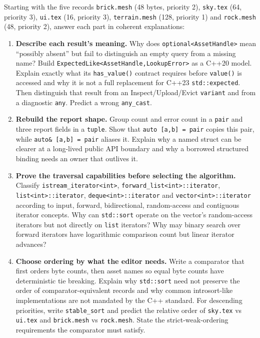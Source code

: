 Starting with the five records \texttt{brick.mesh} (48 bytes, priority 2), \texttt{sky.tex} (64, priority 3), \texttt{ui.tex} (16, priority 3), \texttt{terrain.mesh} (128, priority 1) and \texttt{rock.mesh} (48, priority 2), answer each part in coherent explanations:

\begin{enumerate}
\def\labelenumi{\arabic{enumi}.}
\item
  \textbf{Describe each result's meaning.} Why does \texttt{optional\textless{}AssetHandle\textgreater{}} mean ``possibly absent'' but fail to distinguish an empty query from a missing name? Build \texttt{ExpectedLike\textless{}AssetHandle,LookupError\textgreater{}} as a C++20 model. Explain exactly what its \texttt{has\_value()} contract requires before \texttt{value()} is accessed and why it is not a full replacement for C++23 \texttt{std::expected}. Then distinguish that result from an Inspect/Upload/Evict \texttt{variant} and from a diagnostic \texttt{any}. Predict a wrong \texttt{any\_cast}.
\item
  \textbf{Rebuild the report shape.} Group count and error count in a \texttt{pair} and three report fields in a \texttt{tuple}. Show that \texttt{auto\ {[}a,b{]}\ =\ pair} copies this pair, while \texttt{auto\&\ {[}a,b{]}\ =\ pair} aliases it. Explain why a named struct can be clearer at a long-lived public API boundary and why a borrowed structured binding needs an owner that outlives it.
\item
  \textbf{Prove the traversal capabilities before selecting the algorithm.} Classify \texttt{istream\_iterator\textless{}int\textgreater{}}, \texttt{forward\_list\textless{}int\textgreater{}::iterator}, \texttt{list\textless{}int\textgreater{}::iterator}, \texttt{deque\textless{}int\textgreater{}::iterator} and \texttt{vector\textless{}int\textgreater{}::iterator} according to input, forward, bidirectional, random-access and contiguous iterator concepts. Why can \texttt{std::sort} operate on the vector's random-access iterators but not directly on \texttt{list} iterators? Why may binary search over forward iterators have logarithmic comparison count but linear iterator advances?
\item
  \textbf{Choose ordering by what the editor needs.} Write a comparator that first orders byte counts, then asset names so equal byte counts have deterministic tie breaking. Explain why \texttt{std::sort} need not preserve the order of comparator-equivalent records and why common introsort-like implementations are not mandated by the C++ standard. For descending priorities, write \texttt{stable\_sort} and predict the relative order of \texttt{sky.tex} vs \texttt{ui.tex} and \texttt{brick.mesh} vs \texttt{rock.mesh}. State the strict-weak-ordering requirements the comparator must satisfy.

\end{enumerate}
